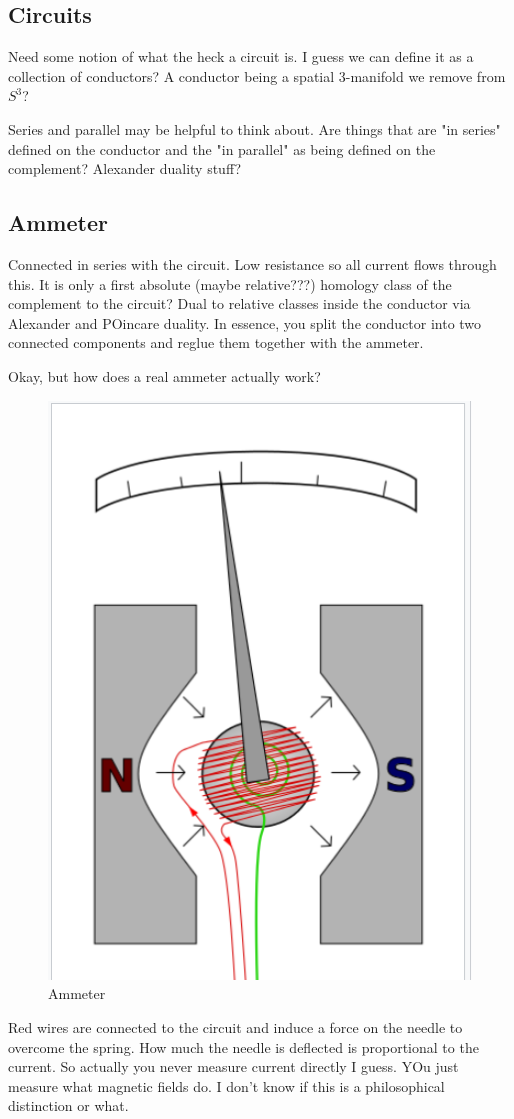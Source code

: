 \documentclass{article}
\begin{document}
\subsection{Circuits}
Need some notion of what the heck a circuit is. 
I guess we can define it as a collection of conductors? 
A conductor being a spatial 3-manifold we remove from $S^3$?

Series and parallel may be helpful to think about. 
Are things that are "in series" defined on the conductor and the "in parallel" as being defined on the complement? 
Alexander duality stuff?

\subsection{Ammeter}
Connected in series with the circuit. 
Low resistance so all current flows through this. 
It is only a first absolute (maybe relative???) homology class of the complement to the circuit? Dual to relative classes inside the conductor via Alexander and POincare duality. 
In essence, you split the conductor into two connected components and reglue them together with the ammeter.

Okay, but how does a real ammeter actually work? 
\begin{figure}
    \centering
    \includegraphics{figures/ammeter.png}
    \caption{Ammeter}
\end{figure}
Red wires are connected to the circuit and induce a force on the needle to overcome the spring. 
How much the needle is deflected is proportional to the current.
So actually you never measure current directly I guess. 
YOu just measure what magnetic fields do. 
I don't know if this is a philosophical distinction or what.
\end{document}
